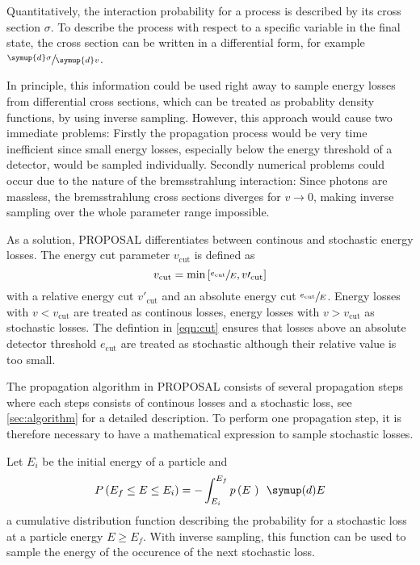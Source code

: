 Quantitatively, the interaction probability for a process is described by its cross section $\sigma$.
To describe the process with respect to a specific variable in the final state, the cross section can be written in a differential form, for example $\sfrac{\symup{d}\sigma}{\symup{d}v}$.

In principle, this information could be used right away to sample energy losses from differential cross sections, which can be treated as probablity density functions, by using inverse sampling.
However, this approach would cause two immediate problems:
Firstly the propagation process would be very time inefficient since small energy losses, especially below the energy threshold of a detector, would be sampled individually.
Secondly numerical problems could occur due to the nature of the bremsstrahlung interaction:
Since photons are massless, the bremsstrahlung cross sections diverges for $v \to 0$, making inverse sampling over the whole parameter range impossible.

As a solution, PROPOSAL differentiates between continous and stochastic energy losses.
The energy cut parameter $v_\text{cut}$ is defined as
\begin{equation}
	\label{eqn:cut}
	v_\text{cut} = \text{min}\left[\sfrac{e_\text{cut}}{E}, v\prime_\text{cut} \right]
\end{equation}
with a relative energy cut $v\prime_\text{cut}$ and an absolute energy cut $\sfrac{e_\text{cut}}{E}$.
Energy losses with $v < v_\text{cut}$ are treated as continous losses, energy losses with $v > v_\text{cut}$ as stochastic losses.
The defintion in \ref{eqn:cut} ensures that losses above an absolute detector threshold $e_\text{cut}$ are treated as stochastic although their relative value is too small.

The propagation algorithm in PROPOSAL consists of several propagation steps where each steps consists of continous losses and a stochastic loss, see \ref{sec:algorithm} for a detailed description.
To perform one propagation step, it is therefore necessary to have a mathematical expression to sample stochastic losses.

Let $E_i$ be the initial energy of a particle and
\begin{equation}
	\label{eqn:cum}
	P\left(E_f \leq E \leq E_i\right) = - \int_{E_i}^{E_f} p\left(E \right) \, \symup(d)E
\end{equation}
a cumulative distribution function describing the probability for a stochastic loss at a particle energy $E \geq E_f$.
With inverse sampling, this function can be used to sample the energy of the occurence of the next stochastic loss.

